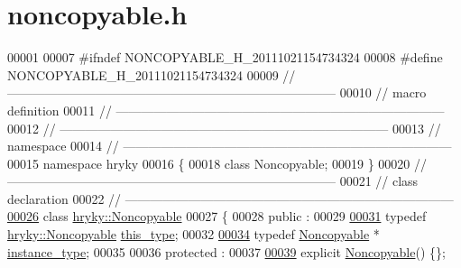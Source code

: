 \hypertarget{noncopyable_8h_source}{\section{noncopyable.\-h}
}

\begin{DoxyCode}
00001 
00007 \textcolor{preprocessor}{#ifndef NONCOPYABLE\_H\_20111021154734324}
00008 \textcolor{preprocessor}{}\textcolor{preprocessor}{#define NONCOPYABLE\_H\_20111021154734324}
00009 \textcolor{preprocessor}{}\textcolor{comment}{//
      ------------------------------------------------------------------------------}
00010 \textcolor{comment}{// macro definition}
00011 \textcolor{comment}{//
      ------------------------------------------------------------------------------}
00012 \textcolor{comment}{//
      ------------------------------------------------------------------------------}
00013 \textcolor{comment}{// namespace}
00014 \textcolor{comment}{//
      ------------------------------------------------------------------------------}
00015 \textcolor{keyword}{namespace }hryky
00016 \{
00018     \textcolor{keyword}{class }Noncopyable;
00019 \}
00020 \textcolor{comment}{//
      ------------------------------------------------------------------------------}
00021 \textcolor{comment}{// class declaration}
00022 \textcolor{comment}{//
      ------------------------------------------------------------------------------}
\hypertarget{noncopyable_8h_source_l00026}{}\hyperlink{classhryky_1_1_noncopyable}{00026} \textcolor{comment}{}\textcolor{keyword}{class }\hyperlink{classhryky_1_1_noncopyable}{hryky::Noncopyable}
00027 \{
00028 \textcolor{keyword}{public} :
00029 
\hypertarget{noncopyable_8h_source_l00031}{}\hyperlink{classhryky_1_1_noncopyable_acf13ad1c98a76247a561dff514979da5}{00031}     \textcolor{keyword}{typedef} \hyperlink{classhryky_1_1_noncopyable}{hryky::Noncopyable} \hyperlink{classhryky_1_1_noncopyable_acf13ad1c98a76247a561dff514979da5}{this_type};
00032 
\hypertarget{noncopyable_8h_source_l00034}{}\hyperlink{classhryky_1_1_noncopyable_aaf87abb55f700af85ecb0895f6178821}{00034}     \textcolor{keyword}{typedef} \hyperlink{classhryky_1_1_noncopyable}{Noncopyable} * \hyperlink{classhryky_1_1_noncopyable_aaf87abb55f700af85ecb0895f6178821}{instance_type};
00035 
00036 \textcolor{keyword}{protected} :
00037 
\hypertarget{noncopyable_8h_source_l00039}{}\hyperlink{classhryky_1_1_noncopyable_a4be18fc3db624b52a1326d4a29058feb}{00039}     \textcolor{keyword}{explicit} \hyperlink{classhryky_1_1_noncopyable_a4be18fc3db624b52a1326d4a29058feb}{Noncopyable}() \{\};

\end{DoxyCode}

